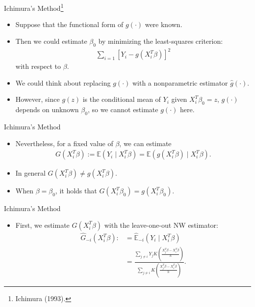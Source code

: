 \documentclass[xcolor=svgnames,dvipdfmx,cjk]{beamer}
\theoremstyle{example}
\begin{document}
\begin{frame}{Ichimura's Method\footnote{Ichimura (1993).}}
\begin{itemize}
  \item Suppose that the functional form of $g(\cdot)$ were known.
  \item Then we could estimate $\beta_0$ by minimizing the least-squares criterion:
        \begin{align*}
        \sum_{i=1} \left[ Y_i - g(X_i^{T}\beta) \right]^2
        \end{align*}
        with respect to $\beta$.
  \item We could think about replacing $g(\cdot)$ with a nonparametric estimator $\hat{g}(\cdot)$.
  \item However, since $g(z)$ is the conditional mean of $Y_i$ given $X_i^{T} \beta_0 = z$,
        \alert{$g(\cdot)$ depends on unknown $\beta_0$}, so we cannot estimate $g(\cdot)$ here.
\end{itemize}
\end{frame}

\begin{frame}{Ichimura's Method}
\begin{itemize}
  \item Nevertheless, \alert{for a fixed value of $\beta$}, we can estimate
        \begin{align*}
        G(X_i^{T} \beta) 
          := \mathbb{E} (Y_i \mid X_i^{T}\beta) 
           = \mathbb{E} (g(X_i^{T}\beta) \mid X_i^{T}\beta).
        \end{align*}
  \item In general $G(X_i^{T}\beta) \neq g(X_i^{T} \beta)$.
  \item When $\beta = \beta_0$,
        it holds that $G(X_i^{T}\beta_0) = g(X_i^{T} \beta_0)$. 
\end{itemize}  
\end{frame}

\begin{frame}{Ichimura's Method}
  \begin{itemize}
  \item First, we estimate $G(X_i^{T}\beta)$  
        with the leave-one-out NW estimator:
        \begin{align*}
          \hat{G}_{-i}(X_i^{T}\beta) 
              :&= \hat{\mathbb{E}}_{-i}(Y_i \mid X_i^{T} \beta) \\
               &= \frac
                  {\sum_{j \neq i} Y_j 
                   K \left( \frac
                            {X_j^{T}\beta - X_i^{T}\beta}
                            {h} 
                     \right) 
                  }
                  {\sum_{j \neq i} 
                   K \left( \frac
                           {X_j^{T}\beta - X_i^{T}\beta}
                           {h} 
                     \right) 
                  }.
        \end{align*}
\end{itemize}
\end{frame}
\end{document}
